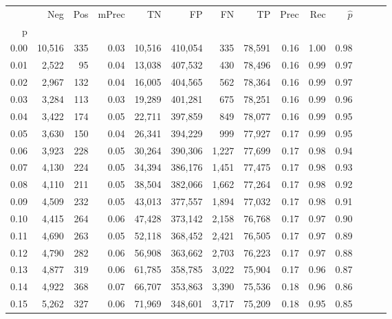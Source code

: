\begin{tabular}{rrrrrrrrrrrrrr}
\toprule
{} &     Neg &    Pos & mPrec &       TN &       FP &      FN &      TP &  Prec &   Rec & $\hat{p}$ \\
p    &         &        &       &          &          &         &         &       &       &           \\
\midrule
0.00 &  10,516 &    335 &  0.03 &   10,516 &  410,054 &     335 &  78,591 &  0.16 &  1.00 &      0.98 \\
0.01 &   2,522 &     95 &  0.04 &   13,038 &  407,532 &     430 &  78,496 &  0.16 &  0.99 &      0.97 \\
0.02 &   2,967 &    132 &  0.04 &   16,005 &  404,565 &     562 &  78,364 &  0.16 &  0.99 &      0.97 \\
0.03 &   3,284 &    113 &  0.03 &   19,289 &  401,281 &     675 &  78,251 &  0.16 &  0.99 &      0.96 \\
0.04 &   3,422 &    174 &  0.05 &   22,711 &  397,859 &     849 &  78,077 &  0.16 &  0.99 &      0.95 \\
0.05 &   3,630 &    150 &  0.04 &   26,341 &  394,229 &     999 &  77,927 &  0.17 &  0.99 &      0.95 \\
0.06 &   3,923 &    228 &  0.05 &   30,264 &  390,306 &   1,227 &  77,699 &  0.17 &  0.98 &      0.94 \\
0.07 &   4,130 &    224 &  0.05 &   34,394 &  386,176 &   1,451 &  77,475 &  0.17 &  0.98 &      0.93 \\
0.08 &   4,110 &    211 &  0.05 &   38,504 &  382,066 &   1,662 &  77,264 &  0.17 &  0.98 &      0.92 \\
0.09 &   4,509 &    232 &  0.05 &   43,013 &  377,557 &   1,894 &  77,032 &  0.17 &  0.98 &      0.91 \\
0.10 &   4,415 &    264 &  0.06 &   47,428 &  373,142 &   2,158 &  76,768 &  0.17 &  0.97 &      0.90 \\
0.11 &   4,690 &    263 &  0.05 &   52,118 &  368,452 &   2,421 &  76,505 &  0.17 &  0.97 &      0.89 \\
0.12 &   4,790 &    282 &  0.06 &   56,908 &  363,662 &   2,703 &  76,223 &  0.17 &  0.97 &      0.88 \\
0.13 &   4,877 &    319 &  0.06 &   61,785 &  358,785 &   3,022 &  75,904 &  0.17 &  0.96 &      0.87 \\
0.14 &   4,922 &    368 &  0.07 &   66,707 &  353,863 &   3,390 &  75,536 &  0.18 &  0.96 &      0.86 \\
0.15 &   5,262 &    327 &  0.06 &   71,969 &  348,601 &   3,717 &  75,209 &  0.18 &  0.95 &      0.85 \\

\end{tabular}
